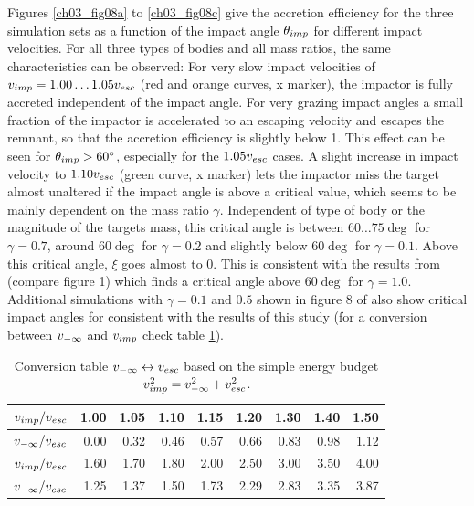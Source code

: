 Figures \ref{ch03_fig08a} to \ref{ch03_fig08c} give the accretion efficiency for the three simulation sets as a function of the impact angle $\theta_{imp}$ for different impact velocities. For all three types of bodies and all mass ratios, the same characteristics can be observed: For very slow impact velocities of $v_{imp} = 1.00 \dots 1.05 v_{esc}$ (red and orange curves, x marker), the impactor is fully accreted independent of the impact angle. For very grazing impact angles a small fraction of the impactor is accelerated to an escaping velocity and escapes the remnant, so that the accretion efficiency is slightly below 1. This effect can be seen for $\theta_{imp} > 60 ^\circ$, especially for the $1.05 v_{esc}$ cases. A slight increase in impact velocity to $1.10 v_{esc}$ (green curve, x marker) lets the impactor miss the target almost unaltered if the impact angle is above a critical value, which seems to be mainly dependent on the mass ratio $\gamma$. Independent of type of body or the magnitude of the targets mass, this critical angle is between $60 \dots 75 \deg$ for $\gamma = 0.7$,  around $60 \deg$ for $\gamma = 0.2$ and slightly below $60 \deg$ for $\gamma = 0.1$. Above this critical angle, $\xi$ goes almost to 0. This is consistent with the results from \cite{Agnor:2004p3329} (compare figure 1) which finds a critical angle above $60 \deg$ for $\gamma = 1.0$. Additional simulations with $\gamma = 0.1$ and $0.5$ shown in figure 8 of \cite{Asphaug:2010p3539} also show critical impact angles for consistent with the results of this study (for a conversion between $v_{-\infty}$ and $v_{imp}$ check table \ref{ch03_tbl01}).
\begin{table}[htdp]
\begin{center}
\begin{tabular}{l|r|r|r|r|r|r|r|r}
$v_{imp} / v_{esc}$ & 1.00 & 1.05 & 1.10 & 1.15 & 1.20 & 1.30 & 1.40 & 1.50 \\
\hline
$v_{-\infty} / v_{esc}$ & 0.00 & 0.32 & 0.46 & 0.57 & 0.66 & 0.83 & 0.98 & 1.12\\
\hline
\hline
$v_{imp} / v_{esc}$ & 1.60 & 1.70 & 1.80 & 2.00 & 2.50 & 3.00 & 3.50 & 4.00\\
\hline
$v_{-\infty} / v_{esc}$ & 1.25 & 1.37 & 1.50 & 1.73 & 2.29 & 2.83 & 3.35 & 3.87\\
\end{tabular}
\end{center}
\caption{Conversion table $v_{-\infty} \leftrightarrow v_{esc}$ based on the simple energy budget $v_{imp}^2 = v_{-\infty}^2 + v_{esc}^2$.}
\label{ch03_tbl01}
\end{table} 
